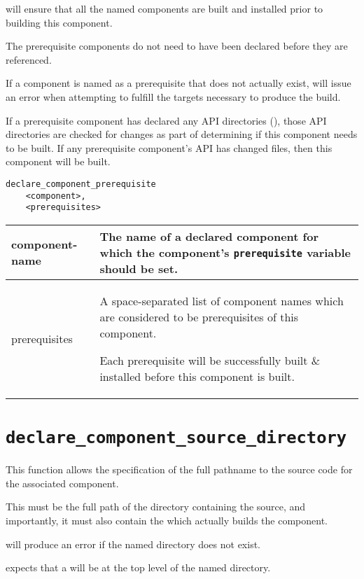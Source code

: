 \lmsbw will ensure that all the named components are built and
installed prior to building this component.

The prerequisite components do not need to have been declared before
they are referenced.

If a component is named as a prerequisite that does not actually
exist, \make will issue an error when attempting to fulfill the
targets necessary to produce the build.

If a prerequisite component has declared any API directories
(), those API directories are
checked for changes as part of determining if this component needs to
be built.  If any prerequisite component's API has changed files, then
this component will be built.

\begin{minipage}{\linewidth}
\begin{verbatim}
declare_component_prerequisite
    <component>,
    <prerequisites>
\end{verbatim}

\begin{tabularx}{\linewidth}{l|X}
component-name &
  The name of a declared component for which the component's
  \texttt{prerequisite} variable should be set. \\

\hline prerequisites &

  A space-separated list of component names which are considered to be
  prerequisites of this component.

  Each prerequisite will be successfully built \& installed before
  this component is built.
\end{tabularx}
\end{minipage}

\section{\texttt{declare\_component\_source\_directory}}\label{api:source-directory}

This function allows the specification of the full pathname to the
source code for the associated component.

This must be the full path of the directory containing the source, and
importantly, it must also contain the \makefile which actually builds
the component.

\lmsbw will produce an error if the named directory does not exist.

\lmsbw expects that a \makefile will be at the top level of the named
directory.

